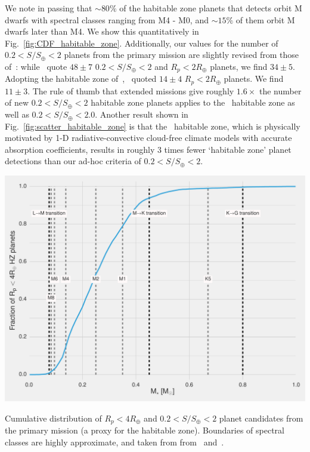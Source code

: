 \begin{enumerate}
	We note in passing that $\sim 80\%$ of the habitable zone planets that \tess detects orbit M dwarfs with spectral classes ranging from M4 - M0, and $\sim 15\%$ of them orbit M dwarfs later than M4.
	We show this quantitatively in Fig.~\ref{fig:CDF_habitable_zone}.
	Additionally, our values for the number of $0.2<S/S_\oplus<2$ planets from the primary mission are slightly revised from those of~: while~ quote $48\pm7$  $0.2<S/S_\oplus<2$ and $R_p<2R_\oplus$ planets, we find $34 \pm 5$.
	Adopting the habitable zone of~\citet{kopparapu_habitable_2013},~ quoted $14\pm4$  $R_p<2R_\oplus$ planets. We find $11 \pm 3$.
	The rule of thumb that extended missions give roughly $1.6\times$ the number of new $0.2<S/S_\oplus<2$ habitable zone planets applies to the~\citet{kopparapu_habitable_2013} habitable zone as well as $0.2<S/S_\oplus<2.0$.
	Another result shown in Fig.~\ref{fig:scatter_habitable_zone} is that the~\citet{kopparapu_habitable_2013} habitable zone, which is physically motivated by 1-D radiative-convective cloud-free climate models with accurate absorption coefficients, results in roughly 3 times fewer `habitable zone' planet detections than our ad-hoc criteria of $0.2<S/S_\oplus<2$.
	\begin{marginfigure}
		\centering
		\includegraphics[scale=1.]{figures/CDF_most_HZ_planets_orbit_early_M_dwarfs.pdf}
		\caption{Cumulative distribution of $R_p<4R_\oplus$ and $0.2<S/S_\oplus<2$ planet candidates from the primary mission (a proxy for the habitable zone). Boundaries of spectral classes are highly approximate, and taken from from~\protect\citet{habets_empirical_1981} and~\protect\citet{baraffe_massspectral_1996}.}

\end{marginfigure}
\end{enumerate}
